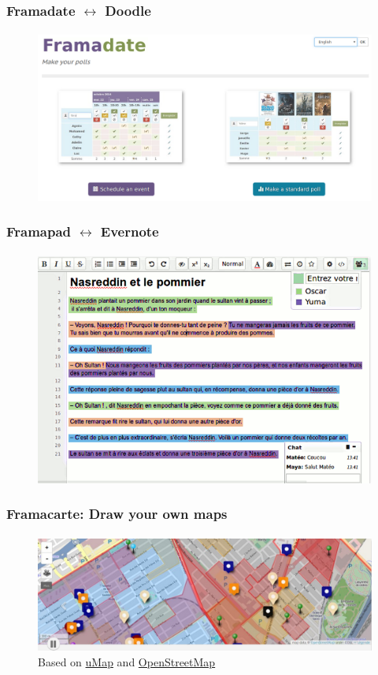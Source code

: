 \documentclass{beamer}
\begin{document}
	\begin{frame}
	\frametitle{Framadate $\leftrightarrow$ Doodle}
	\framesubtitle{}
	        \begin{figure}[h]
                \centering
                \includegraphics[width=.8\textwidth]{./images/framadate}
        	\end{figure}
	\end{frame}

	\begin{frame}
	\frametitle{Framapad $\leftrightarrow$ Evernote}
	\framesubtitle{}
	        \begin{figure}[h]
                \centering
                \includegraphics[width=.8\textwidth]{./images/framapad}
        	\end{figure}
	\end{frame}

	\begin{frame}
	\frametitle{Framacarte: Draw your own maps}
	\framesubtitle{}
	        \begin{figure}[h]
                \centering
                \includegraphics[width=.8\textwidth]{./images/framacarte}
		\caption{Based on \href{https://github.com/umap-project/umap/}{uMap} and \href{https://www.openstreetmap.org}{OpenStreetMap}} 
        	\end{figure}
	\end{frame}
\end{document}
